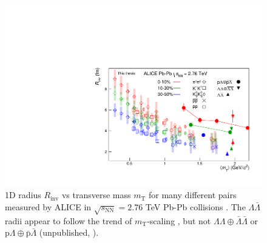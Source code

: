 

\begin{figure}[hbt]
\includegraphics[width=36pc]{Figures/FitResults/2016-09-29-mTscaling.pdf}
\caption[$R_{\mathrm{inv}}$ vs $m_{\mathrm{T}}$]{1D radius $R_\mathrm{inv}$ vs transverse mass $m_\mathrm{T}$ for many different pairs measured by ALICE in $\sqrt{s_\mathrm{NN}} = 2.76$ TeV Pb-Pb collisions \cite{Adam:2015vja}.
The $\Lambda\bar{\Lambda}$ radii appear to follow the trend of $m_\mathrm{T}$-scaling \cite{Csorgo:1995bi,Lisa:2005dd}, but not $\Lambda\Lambda\oplus\bar{\Lambda}\bar{\Lambda}$ or $\mathrm{p}\Lambda\oplus\bar{\mathrm{p}}\bar{\Lambda}$ (unpublished, \cite{Beck:2015msi}).
}
\label{fig:RvsMt}
\end{figure}

